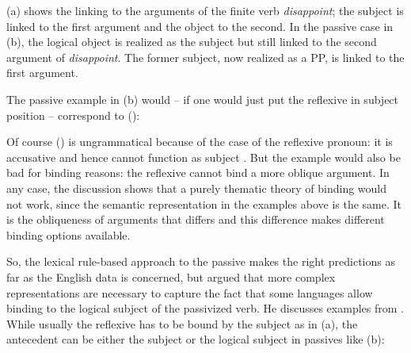 \documentclass[output=paper,biblatex,babelshorthands,newtxmath,draftmode,colorlinks,citecolor=brown]{langscibook}
\begin{document}
{\jamwidth=5cm
\eal
{}
\zl
(a) shows the linking to the arguments of the finite verb \emph{disappoint}; the subject is
linked to the first argument and the object to the second. In the passive case in (b), the
logical object is realized as the subject but still linked to the second argument of
\emph{disappoint}. The former subject, now realized as a PP, is linked to the first argument. 

\largerpage[2]
The passive example in (b) would -- if one would just put the reflexive in subject position
-- correspond to ():
\z
}

\noindent
Of course () is ungrammatical because of the case of the reflexive pronoun: it is accusative
and hence cannot function as subject \citep[]{Brame77}. But the example would also be bad for binding reasons: the
reflexive cannot bind a more oblique argument. In any case, the discussion shows that a purely
thematic theory of binding would not work, since the semantic representation in the examples above is
the same. It is the obliqueness of arguments that differs and this difference makes different binding options available.

So, the lexical rule-based approach to the passive makes the right predictions as far as the English
data is concerned, but \citet{Perlmutter1984} argued that more complex representations are necessary to capture the
fact that some languages allow binding to the logical subject of the passivized verb. He discusses
examples from . While usually the reflexive has to be bound by the subject as in
(a), the antecedent can be either the subject or the logical subject in passives like (b):
\end{document}
